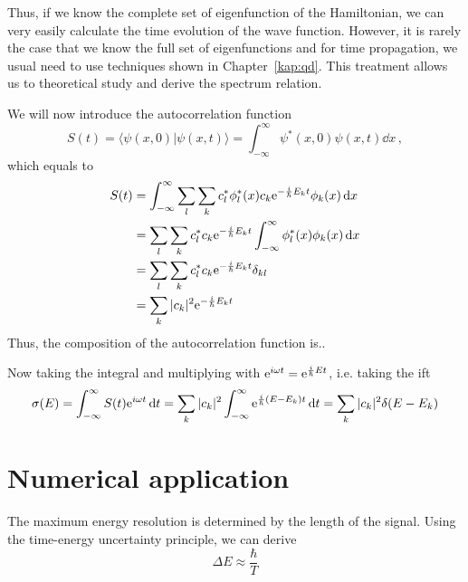 Thus, if we know the complete set of eigenfunction of the Hamiltonian, we can very easily calculate the time evolution of the wave function. However, it is rarely the case that we know the full set of eigenfunctions and for time propagation, we usual need to use techniques shown in Chapter~\ref{kap:qd}. This treatment allows us to theoretical study and derive the spectrum relation.

We will now introduce the autocorrelation function
\begin{equation}
    S(t) = \langle \psi(x,0) | \psi(x,t) \rangle =\int_{-\infty}^{\infty}\psi^*(x,0) \psi(x,t) \dd x\, ,
\end{equation}
which equals to
\begin{align}
    S(t) &= \int_{-\infty}^{\infty} \sum_l \sum_k c_l^* \phi_l^*(x) c_k \mathrm{e}^{-\frac{i}{\hbar}E_k t}\phi_k(x) \mathop{}\!\mathrm{d} x \notag\\
    &= \sum_l \sum_k c^*_l c_k \mathrm{e}^{-\frac{i}{\hbar}E_k t} \int_{-\infty}^{\infty}  \phi_l^*(x) \phi_k(x) \mathop{}\!\mathrm{d} x \notag\\
    &= \sum_l \sum_k c^*_l c_k \mathrm{e}^{-\frac{i}{\hbar}E_k t} \delta_{kl} \notag\\
    &= \sum_k |c_k|^2 \mathrm{e}^{-\frac{i}{\hbar}E_k t}
\end{align}
Thus, the composition of the autocorrelation function is..

Now taking the integral and multiplying with $\mathrm{e}^{i\omega t} = \mathrm{e}^{\frac{i}{\hbar}Et}$, i.e. taking the \acrlong{ift}
\begin{equation}
    \sigma(E) = \int_{-\infty}^{\infty} S(t) \mathrm{e}^{i\omega t} \mathop{}\!\mathrm{d} t = \sum_k |c_k|^2 \int_{-\infty}^{\infty} \mathrm{e}^{\frac{i}{\hbar}(E-E_k)t} \mathop{}\!\mathrm{d} t = \sum_k |c_k|^2 \delta(E-E_k)
\end{equation}

\section{Numerical application}

The maximum energy resolution is determined by the length of the signal. Using the time-energy uncertainty principle, we can derive
\begin{equation}
    \Delta E \approx \frac{\hbar}{T}
\end{equation}

